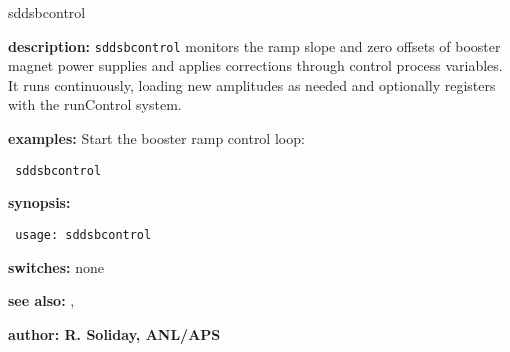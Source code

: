 %
\begin{sddsprog}{sddsbcontrol}
\item {\bf description:}
\verb+sddsbcontrol+ monitors the ramp slope and zero offsets of booster magnet power supplies and applies corrections through control process variables. It runs continuously, loading new amplitudes as needed and optionally registers with the runControl system.

\item {\bf examples:}
Start the booster ramp control loop:
\begin{flushleft}{\tt
sddsbcontrol\\
}\end{flushleft}

\item {\bf synopsis:}
\begin{flushleft}{\tt
usage: sddsbcontrol\\
}\end{flushleft}

\item {\bf switches:} none

\item {\bf see also:} , 

\item {\bf author: R. Soliday, ANL/APS}
\end{sddsprog}
